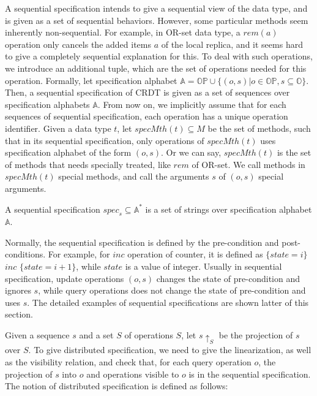 A sequential specification intends to give a sequential view of the data type, and is given as a set of sequential behaviors. However, some particular methods seem inherently non-sequential. For example, in OR-set data type, a $rem(a)$ operation only cancels the added items $a$ of the local replica, and it seems hard to give a completely sequential explanation for this. To deal with such operations, we introduce an additional tuple, which are the set of operations needed for this operation. Formally, let specification alphabet $\mathbb{A} = \mathbb{OP} \cup \{ (o,s) \vert o \in \mathbb{OP}, s \subseteq \mathbb{O} \}$. Then, a sequential specification of CRDT is given as a set of sequences over specification alphabets $\mathbb{A}$. From now on, we implicitly assume that for each sequences of sequential specification, each operation has a unique operation identifier. Given a data type $t$, let $\mathit{specMth}(t) \subseteq M$ be the set of methods, such that in its sequential specification, only operations of $\mathit{specMth}(t)$ uses specification alphabet of the form $(o,s)$. Or we can say, $\mathit{specMth}(t)$ is the set of methods that needs specially treated, like $rem$ of OR-set. We call methods in $\mathit{specMth}(t)$ special methods, and call the arguments $s$ of $(o,s)$ special arguments. 

\begin{definition}
\label{definition:sequential specification}
A sequential specification $\mathit{spec}_s \subseteq \mathbb{A}^*$ is a set of strings over specification alphabet $\mathbb{A}$.
\end{definition}

Normally, the sequential specification is defined by the pre-condition and post-conditions. For example, for $inc$ operation of counter, it is defined as $\{ state = i \}$ $inc$ $\{ state = i+1 \}$, while $state$ is a value of integer. Usually in sequential specification, update operations $(o,s)$ changes the state of pre-condition and ignores $s$, while query operations does not change the state of pre-condition and uses $s$. The detailed examples of sequential specifications are shown latter of this section.

 Given a sequence $s$ and a set $S$ of operations $S$, let $s \uparrow_{S}$ be the projection of $s$ over $S$. To give distributed specification, we need to give the linearization, as well as the visibility relation, and check that, for each query operation $o$, the projection of $s$ into $o$ and operations visible to $o$ is in the sequential specification. The notion of distributed specification is defined as follows:


